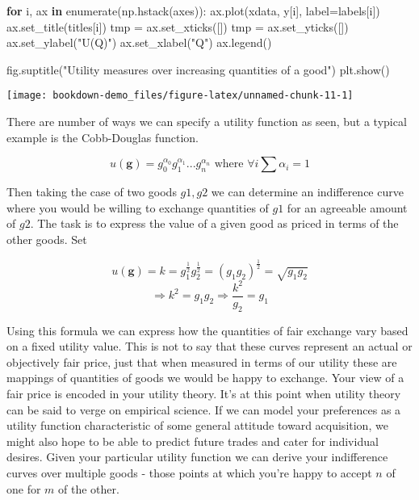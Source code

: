 \documentclass[]{tufte-book}
\newenvironment{Shaded}{}{}
\newcommand{\BuiltInTok}[1]{#1}
\newcommand{\ControlFlowTok}[1]{\textcolor[rgb]{0.00,0.44,0.13}{\textbf{#1}}}
\newcommand{\KeywordTok}[1]{\textcolor[rgb]{0.00,0.44,0.13}{\textbf{#1}}}
\newcommand{\NormalTok}[1]{#1}
\newcommand{\OperatorTok}[1]{\textcolor[rgb]{0.40,0.40,0.40}{#1}}
\newcommand{\StringTok}[1]{\textcolor[rgb]{0.25,0.44,0.63}{#1}}
\theoremstyle{definition}
\theoremstyle{definition}
\theoremstyle{definition}
\theoremstyle{remark}
\begin{document}
\begin{Shaded}
\begin{Highlighting}[]
\ControlFlowTok{for}\NormalTok{ i, ax }\KeywordTok{in} \BuiltInTok{enumerate}\NormalTok{(np.hstack(axes)):}
\NormalTok{    ax.plot(xdata, y[i], label}\OperatorTok{=}\NormalTok{labels[i])}
\NormalTok{    ax.set\_title(titles[i])}
\NormalTok{    tmp }\OperatorTok{=}\NormalTok{ ax.set\_xticks([])}
\NormalTok{    tmp }\OperatorTok{=}\NormalTok{ ax.set\_yticks([])}
\NormalTok{    ax.set\_ylabel(}\StringTok{"U(Q)"}\NormalTok{)}
\NormalTok{    ax.set\_xlabel(}\StringTok{"Q"}\NormalTok{)}
\NormalTok{    ax.legend()}
    
\NormalTok{fig.suptitle(}\StringTok{"Utility measures over increasing quantities of a good"}\NormalTok{)}
\NormalTok{plt.show()}
\end{Highlighting}
\end{Shaded}

\texttt{[image: bookdown-demo\_files/figure-latex/unnamed-chunk-11-1]}

There are number of ways we can specify a utility function as seen, but a typical example is the Cobb-Douglas function.

\[ u(\mathbf{g}) = g_{0}^{\alpha_{0}}g_{1}^{\alpha_{1}} ... g_{n}^{\alpha_{n}} \text{ where } \forall i \sum \alpha_i = 1\]

Then taking the case of two goods \(g1, g2\) we can determine an indifference curve where you would be willing to exchange quantities of \(g1\) for an agreeable amount of \(g2\). The task is to express the value of a given good as priced in terms of the other goods. Set

\[u(\mathbf{g}) = k =  g_{1}^{\frac{1}{2}}g_{2}^{\frac{1}{2}} = (g_{1}g_{2})^{\frac{1}{2}}  = \sqrt{g_{1}g_{2}}\] \[ \Rightarrow k^{2} = g_{1}g_{2} \Rightarrow \frac{k^{2}}{g_{2}} = g_{1}\]

Using this formula we can express how the quantities of fair exchange vary based on a fixed utility value. This is not to say that these curves represent an actual or objectively fair price, just that when measured in terms of our utility these are mappings of quantities of goods we would be happy to exchange. Your view of a fair price is encoded in your utility theory. It's at this point when utility theory can be said to verge on empirical science. If we can model your preferences as a utility function characteristic of some general attitude toward acquisition, we might also hope to be able to predict future trades and cater for individual desires. Given your particular utility function we can derive your indifference curves over multiple goods - those points at which you're happy to accept \(n\) of one for \(m\) of the other.
\end{document}
